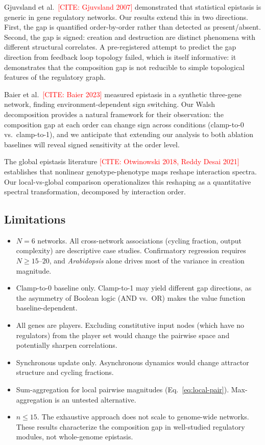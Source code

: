 \documentclass[11pt]{article}
\newcommand{\citeneeded}[1]{\textcolor{red}{[CITE: #1]}}
\begin{document}
Gjuvsland et al.\ \citeneeded{Gjuvsland 2007} demonstrated that
statistical epistasis is generic in gene regulatory networks. Our
results extend this in two directions. First, the gap is quantified
order-by-order rather than detected as present/absent. Second, the
gap is signed: creation and destruction are distinct phenomena with
different structural correlates. A pre-registered attempt to predict
the gap direction from feedback loop topology failed, which is itself
informative: it demonstrates that the composition gap is not
reducible to simple topological features of the regulatory graph.

Baier et al.\ \citeneeded{Baier 2023} measured epistasis in a
synthetic three-gene network, finding environment-dependent sign
switching. Our Walsh decomposition provides a natural framework for
their observation: the composition gap at each order can change sign
across conditions (clamp-to-0 vs.\ clamp-to-1), and we anticipate
that extending our analysis to both ablation baselines will reveal
signed sensitivity at the order level.

The global epistasis literature \citeneeded{Otwinowski 2018, Reddy
Desai 2021} establishes that nonlinear genotype-phenotype maps
reshape interaction spectra. Our local-vs-global comparison
operationalizes this reshaping as a quantitative spectral
transformation, decomposed by interaction order.


\subsection{Limitations}

\begin{itemize}
\item $N = 6$ networks. All cross-network associations (cycling
  fraction, output complexity) are descriptive case studies.
  Confirmatory regression requires $N \geq 15$--$20$, and
  \emph{Arabidopsis} alone drives most of the variance in creation
  magnitude.
\item Clamp-to-0 baseline only. Clamp-to-1 may yield different gap
  directions, as the asymmetry of Boolean logic (AND vs.\ OR) makes
  the value function baseline-dependent.
\item All genes are players. Excluding constitutive input nodes
  (which have no regulators) from the player set would change the
  pairwise space and potentially sharpen correlations.
\item Synchronous update only. Asynchronous dynamics would change
  attractor structure and cycling fractions.
\item Sum-aggregation for local pairwise magnitudes
  (Eq.~\ref{eq:local-pair}). Max-aggregation is an untested
  alternative.
\item $n \leq 15$. The exhaustive approach does not scale to
  genome-wide networks. These results characterize the composition
  gap in well-studied regulatory modules, not whole-genome epistasis.
\end{itemize}
\end{document}
